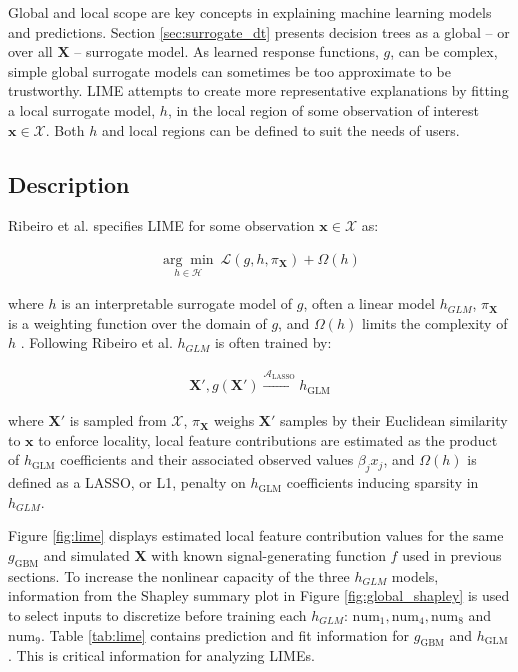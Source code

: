\documentclass[11pt]{asaproc}
\begin{document}
Global and local scope are key concepts in explaining machine learning models and predictions. Section \ref{sec:surrogate_dt} presents decision trees as a global -- or over all $\mathbf{X}$ -- surrogate model. As learned response functions, $g$, can be complex, simple global surrogate models can sometimes be too approximate to be trustworthy. LIME attempts to create more representative explanations by fitting a local surrogate model, $h$, in the local region of some observation of interest $\mathbf{x} \in \mathcal{X}$. Both $h$ and local regions can be defined to suit the needs of users.

\subsection{Description}

Ribeiro et al. specifies LIME for some observation $\mathbf{x} \in \mathcal{X}$ as:

\begin{equation}
\begin{aligned}
\underset{h \in \mathcal{H}}{\arg\min}\:\mathcal{L}(g, h, \pi_{\mathbf{X}}) + \Omega(h)
\end{aligned}
\end{equation}

\noindent where $h$ is an interpretable surrogate model of $g$, often a linear model $h_{GLM}$, $\pi_{\mathbf{X}}$ is a weighting function over the domain of $g$, and $\Omega(h)$ limits the complexity of $h$ \cite{lime}. Following Ribeiro et al. $h_{GLM}$ is often trained by:

\begin{equation}
\begin{aligned}
\mathbf{X}', g(\mathbf{X}') \xrightarrow{\mathcal{A}_{\text{LASSO}}} h_{\text{GLM}}
\end{aligned}
\end{equation}

\noindent where $\mathbf{X}'$ is sampled from $\mathcal{X}$, $\pi_{\mathbf{X}}$ weighs $\mathbf{X}'$ samples by their Euclidean similarity to $\mathbf{x}$ to enforce locality, local feature contributions are estimated as the product of $h_{\text{GLM}}$ coefficients and their associated observed values $\beta_j x_j$, and $\Omega(h)$ is defined as a LASSO, or L1, penalty on $h_{\text{GLM}}$ coefficients inducing sparsity in $h_{GLM}$. 		

Figure \ref{fig:lime} displays estimated local feature contribution values for the same $g_{\text{GBM}}$ and simulated $\mathbf{X}$ with known signal-generating function $f$ used in previous sections. To increase the nonlinear capacity of the three $h_{GLM}$ models, information from the Shapley summary plot in Figure \ref{fig:global_shapley} is used to select inputs to discretize before training each $h_{GLM}$: $\text{num}_1, \text{num}_4, \text{num}_8$ and $\text{num}_9$. Table \ref{tab:lime} contains prediction and fit information for $g_{\text{GBM}}$ and $h_{\text{GLM}}$. This is critical information for analyzing LIMEs.
\end{document}
